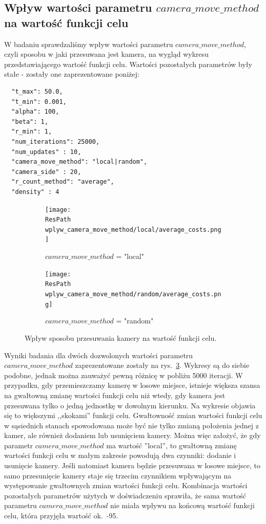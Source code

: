 \documentclass[12pt,a4paper]{article}
\newcommand{\ResPath}{../badania/}
\begin{document}
\subsection{Wpływ wartości parametru $camera\_move\_method$ na wartość funkcji celu}
W badaniu sprawdzaliśmy wpływ wartości parametru $camera\_move\_method$,
czyli sposobu w jaki przesuwana jest kamera, na wygląd wykresu przedstawiającego wartość funkcji celu.
Wartości pozostałych parametrów były stałe - zostały one zaprezentowane poniżej:

\begin{lstlisting}
  "t_max": 50.0,
  "t_min": 0.001,
  "alpha": 100,
  "beta": 1,
  "r_min": 1,
  "num_iterations": 25000,
  "num_updates" : 10,
  "camera_move_method": "local|random",
  "camera_side" : 20,
  "r_count_method": "average",
  "density" : 4
\end{lstlisting}
\begin{figure}[htb]
  \begin{subfigure}[b]{0.5\linewidth}
    \centering
    \texttt{[image: \\ResPath wplyw\_camera\_move\_method/local/average\_costs.png]}
    \caption{$camera\_move\_method$ = "local"}
    \label{fig_cam_move_method:a}
  \end{subfigure}%
  \begin{subfigure}[b]{0.5\linewidth}
    \texttt{[image: \\ResPath wplyw\_camera\_move\_method/random/average\_costs.png]}
    \caption{$camera\_move\_method$ = "random"}
    \label{fig_cam_move_method:b}
  \end{subfigure}
  \caption{Wpływ sposobu przesuwania kamery na wartość funkcji celu.}
  \label{fig_cam_move_method}
\end{figure}
Wyniki badania dla dwóch dozwolonych wartości parametru $camera\_move\_method$
zaprezentowane zostały na rys.\ \ref{fig_cam_move_method}. Wykresy są do siebie
podobne, jednak można zauważyć pewną różnicę w pobliżu 5000 iteracji.
W przypadku, gdy przemieszczamy kamerę w losowe miejsce, istnieje większa
szansa na gwałtowną zmianę wartości funkcji celu niż wtedy, gdy kamera jest
przesuwana tylko o jedną jednostkę w dowolnym kierunku. Na wykresie objawia się
to większymi ,,skokami'' funkcji celu. Gwałtowność zmian wartości funkcji celu
w sąsiednich stanach spowodowana może być nie tylko zmianą położenia jednej z kamer,
ale również dodaniem lub usunięciem kamery. Można więc założyć, że gdy
parametr $camera\_move\_method$ ma wartość ''local'', to gwałtowną zmianę
wartości funkcji celu w małym zakresie powodują dwa czynniki: dodanie i usunięcie
kamery. Jeśli natomiast kamera będzie przesuwana w losowe miejsce, to samo
przesunięcie kamery staje się trzecim czynnikiem wpływającym na występowanie
gwałtownych zmian wartości funkcji celu. Kombinacja wartości pozostałych
parametrów użytych w doświadczeniu sprawiła, że sama wartość parametru
$camera\_move\_method$ nie miała wpływu na końcową wartość funkcji celu,
która przyjęła wartość ok.\ -95.
\end{document}
